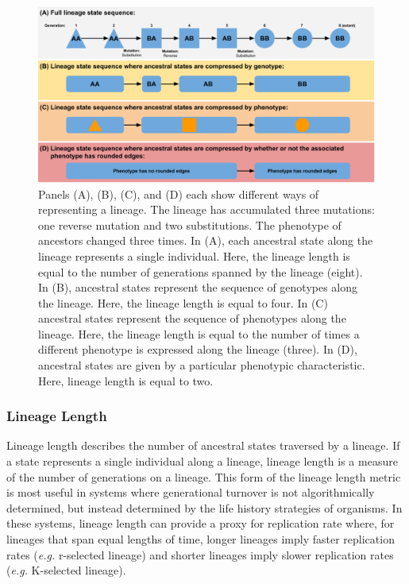 \documentclass[letterpaper]{article}
\begin{document}
\begin{figure}[t]
\includegraphics[width=\textwidth]{figs/lineage_metrics_cartoon.png}
\caption{\small Panels (A), (B), (C), and (D) each show different ways of representing a lineage. The lineage has accumulated three mutations: one reverse mutation and two substitutions. The phenotype of ancestors changed three times. In (A), each ancestral state along the lineage represents a single individual. Here, the lineage length is equal to the number of generations spanned by the lineage (eight). In (B), ancestral states represent the sequence of genotypes along the lineage. Here, the lineage length is equal to four. In (C) ancestral states represent the sequence of phenotypes along the lineage. Here, the lineage length is equal to the number of times a different phenotype is expressed along the lineage (three). In (D), ancestral states are given by a particular phenotypic characteristic. Here, lineage length is equal to two.}
\label{fig:lineage_metrics_cartoon}
\end{figure}

\subsubsection{Lineage Length}
Lineage length describes the number of ancestral states traversed by a lineage. If a state represents a single individual along a lineage, lineage length is a measure of the number of generations on a lineage. This form of the lineage length metric is most useful in systems where generational turnover is not algorithmically determined, but instead determined by the life history strategies of organisms. In these systems, lineage length can provide a proxy for replication rate where, for lineages that span equal lengths of time, longer lineages imply faster replication rates (\textit{e.g.} r-selected lineage) and shorter lineages imply slower replication rates (\textit{e.g.} K-selected lineage). 
\end{document}
